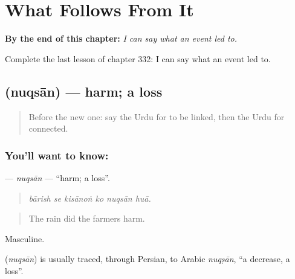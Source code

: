 
\chapter{What Follows From It}
\label{ch:ur-what-follows-from-it}

\begin{chapteropening}
\textbf{By the end of this chapter:} \emph{I can say what an event led to.}

Complete the last lesson of chapter 332: I can say what an event led to.
\end{chapteropening}

\section[\texorpdfstring{\ur{نقصان} (nuqsān)}{نقصان (nuqsān)}]{ (nuqsān) — harm; a loss}

\label{lesson:UR-C332-nuqsan}



\begin{quote}
Before the new one: say the Urdu for to be linked, then the Urdu for connected.
\end{quote}

\subsection*{You'll want to know: }
\textbf{} — \emph{nuqsān} — \textquotedblleft{}harm; a loss\textquotedblright{}.

\begin{quote}
     
\end{quote}

\begin{quote}
\emph{bārish se kisānoṅ ko nuqsān huā.}
\end{quote}

\begin{quote}
The rain did the farmers harm.
\end{quote}

Masculine.

\begin{cousinweb}
\textbf{} (\emph{nuqsān}) is usually traced, through Persian, to Arabic \emph{nuqṣān}, \textquotedblleft{}a decrease, a loss\textquotedblright{}.
\end{cousinweb}

